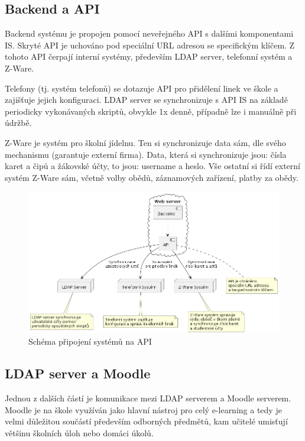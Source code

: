 \documentclass[FM,Proj]{tulthesis}
\begin{document}
\subsection{Backend a API}
\label{section:backend-a-api}
Backend systému je propojen pomocí neveřejného API s dalšími komponentami IS. Skryté API je 
uchováno pod speciální URL adresou se specifickým klíčem. Z tohoto API čerpají interní systémy,
především LDAP server, telefonní systém a Z-Ware.

Telefony (tj. systém telefonů) se dotazuje API pro přidělení linek ve škole a zajišťuje 
jejich konfiguraci. LDAP server se synchronizuje s API IS na základě periodicky vykonávaných
skriptů, obvykle 1x denně, případně lze i manuálně při údržbě.

Z-Ware je systém pro školní jídelnu. Ten si synchronizuje data sám, dle svého mechanismu
(garantuje externí firma). Data, která si synchronizuje jsou: čísla karet a čipů a žákovské 
účty, to jsou: username a heslo. Vše ostatní si řídí externí systém Z-Ware sám, včetně volby
obědů, záznamových zařízení, platby za obědy.

\begin{figure}[H]
    \includegraphics[width=\textwidth-28pt]{backend-api.png}
    \caption{Schéma připojení systémů na API}
    \label{fig:backend-api}
\end{figure}

\subsection{LDAP server a Moodle}
\label{section:ldap-server-a-moodle}
Jednou z dalších částí je komunikace mezi LDAP serverem a Moodle serverem. Moodle je na škole
využíván jako hlavní nástroj pro celý e-learning a tedy je velmi důležitou součástí především
odborných předmětů, kam učitelé umisťují většinu školních úloh nebo domáci úkolů.
\end{document}
